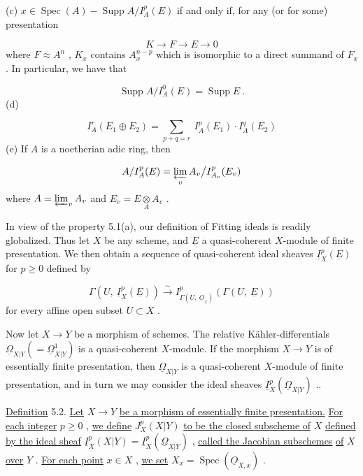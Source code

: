 (c)  $x \in \operatorname{Spec}(A) - \operatorname{Supp} A/I_A^p(E)$  if and only if, for any (or for some) presentation

\begin{equation*}
K \to F \to E \to 0
\end{equation*}
where  $F \approx A^n$ , $K_x$  contains  $A_x^{n-p}$  which is isomorphic to a direct summand of $F_x$ . In particular, we have that

\begin{equation*}
\operatorname{Supp} A/I_A^0(E) = \operatorname{Supp} E \ .
\end{equation*}
(d)

\begin{equation*}
I_A^r(E_1 \oplus E_2) = \sum_{p+q=r} \ I_A^p(E_1) \cdot I_A^q(E_2)
\end{equation*}
(e)  If  $A$  is a noetherian adic ring, then

\begin{equation*}
A/I_A^p(E) = \varprojlim_{v} A_v \big/ I_{A_v}^p (E_v)
\end{equation*}
where  $A = \varprojlim_{v} A_v$  and  $E_v = E \underset{A}{\otimes} A_v$ .

In view of the property 5.1(a), our definition of Fitting ideals is readily globalized. Thus let  $X$  be any scheme, and  $\underline{E}$  a quasi-coherent $X$-module of finite presentation. We then obtain a sequence of quasi-coherent ideal sheaves $\underline{I}_X^p(\underline{E})$  for  $p \geq 0$  defined by

\begin{equation*}
\Gamma(U, \ \underline{I}_X^p(\underline{E})) \xrightarrow{\sim} I^p_{\Gamma(U, \ \underline{O}_x)}(\Gamma(U, \ \underline{E}))
\end{equation*}
for every affine open subset  $U \subset X$ .

Now let  $X \to Y$  be a morphism of schemes. The relative Kähler-differentials $\underline{\Omega}_{X|Y}(= \underline{\Omega}^1_{X|Y})$  is a quasi-coherent $X$-module. If the morphism  $X \to Y$  is of essentially finite presentation, then  $\underline{\Omega}_{X|Y}$  is a quasi-coherent $X$-module of finite presentation, and in turn we may consider the ideal sheaves  $\underline{I}_X^p(\underline{\Omega}_{X|Y})$  ..

\underline{Definition} 5.2.  \underline{Let}  $X \to Y$  \underline{be a morphism of essentially finite presentation.} \underline{For each integer}  $p \geq 0$ , \underline{we define}  $J_X^p(X|Y)$  \underline{to be the closed subscheme of}  $X$
\underline{defined by the ideal sheaf}  $\underline{I}_X^p(X|Y) = \underline{I}_X^p(\underline{\Omega}_{X|Y})$ , \underline{called the Jacobian subschemes} \underline{of}  $X$  \underline{over}  $Y$ . \underline{For each point}  $x \in X$ , \underline{we set}  $X_x = \operatorname{Spec}(\underline{O}_{X,x})$ .

